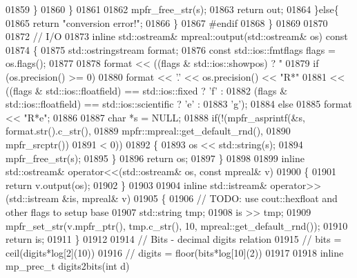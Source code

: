 \begin{DoxyCode}
{01859             \}
01860         \}
01861 
01862         mpfr\_free\_str(s);
01863         \textcolor{keywordflow}{return} out;
01864     \}\textcolor{keywordflow}{else}\{
01865         \textcolor{keywordflow}{return} \textcolor{stringliteral}{"conversion error!"};
01866     \}
01867 \textcolor{preprocessor}{#endif}
01868 \}
01869 
01870 
01872 \textcolor{comment}{// I/O}
01873 \textcolor{keyword}{inline} std::ostream& mpreal::output(std::ostream& os)\textcolor{keyword}{ const}
01874 \textcolor{keyword}{}\{
01875     std::ostringstream format;
01876     \textcolor{keyword}{const} std::ios::fmtflags flags = os.flags();
01877 
01878     format << ((flags & std::ios::showpos) ? \textcolor{stringliteral}{"%
01879     \textcolor{keywordflow}{if} (os.precision() >= 0)
01880         format << \textcolor{charliteral}{'.'} << os.precision() << \textcolor{stringliteral}{"R*"}
01881                << ((flags & std::ios::floatfield) == std::ios::fixed ? \textcolor{charliteral}{'f'} :
01882                    (flags & std::ios::floatfield) == std::ios::scientific ? \textcolor{charliteral}{'e'} :
01883                    \textcolor{charliteral}{'g'});
01884     \textcolor{keywordflow}{else}
01885         format << \textcolor{stringliteral}{"R*e"};
01886 
01887     \textcolor{keywordtype}{char} *s = NULL;
01888     \textcolor{keywordflow}{if}(!(mpfr\_asprintf(&s, format.str().c\_str(),
01889                         mpfr::mpreal::get\_default\_rnd(),
01890                         mpfr\_srcptr())
01891         < 0))
01892     \{
01893         os << std::string(s);
01894         mpfr\_free\_str(s);
01895     \}
01896     \textcolor{keywordflow}{return} os;
01897 \}
01898 
01899 \textcolor{keyword}{inline} std::ostream& operator<<(std::ostream& os, \textcolor{keyword}{const} mpreal& v)
01900 \{
01901     \textcolor{keywordflow}{return} v.output(os);
01902 \}
01903 
01904 \textcolor{keyword}{inline} std::istream& operator>>(std::istream &is, mpreal& v)
01905 \{
01906     \textcolor{comment}{// TODO: use cout::hexfloat and other flags to setup base}
01907     std::string tmp;
01908     is >> tmp;
01909     mpfr\_set\_str(v.mpfr\_ptr(), tmp.c\_str(), 10, mpreal::get\_default\_rnd());
01910     \textcolor{keywordflow}{return} is;
01911 \}
01912 
01914 \textcolor{comment}{//     Bits - decimal digits relation}
01915 \textcolor{comment}{//        bits   = ceil(digits*log[2](10))}
01916 \textcolor{comment}{//        digits = floor(bits*log[10](2))}
01917 
01918 \textcolor{keyword}{inline} mp\_prec\_t digits2bits(\textcolor{keywordtype}{int} d)
}}
\end{DoxyCode}
